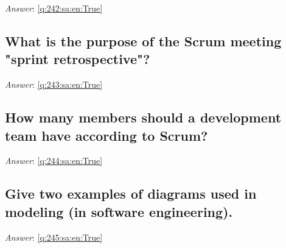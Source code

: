 \documentclass[a4paper,11pt,oneside]{article}
\begin{document}
\begin{sloppypar}
\label{q:242:sa:en:False}

\vspace{2cm}

\noindent\makebox[\textwidth]{\hrulefill}

\vspace{1cm}

\textit{Answer}: \autoref{q:242:sa:en:True}



\subsection{What is the purpose of the Scrum meeting "sprint retrospective"?}

\label{q:243:sa:en:False}

\vspace{2cm}

\noindent\makebox[\textwidth]{\hrulefill}

\vspace{1cm}

\textit{Answer}: \autoref{q:243:sa:en:True}



\subsection{How many members should a development team have according to Scrum?}

\label{q:244:sa:en:False}

\vspace{2cm}

\noindent\makebox[\textwidth]{\hrulefill}

\vspace{1cm}

\textit{Answer}: \autoref{q:244:sa:en:True}



\subsection{Give two examples of diagrams used in modeling (in software engineering).}

\label{q:245:sa:en:False}

\vspace{2cm}

\noindent\makebox[\textwidth]{\hrulefill}

\vspace{1cm}

\textit{Answer}: \autoref{q:245:sa:en:True}




\end{sloppypar}
\end{document}

